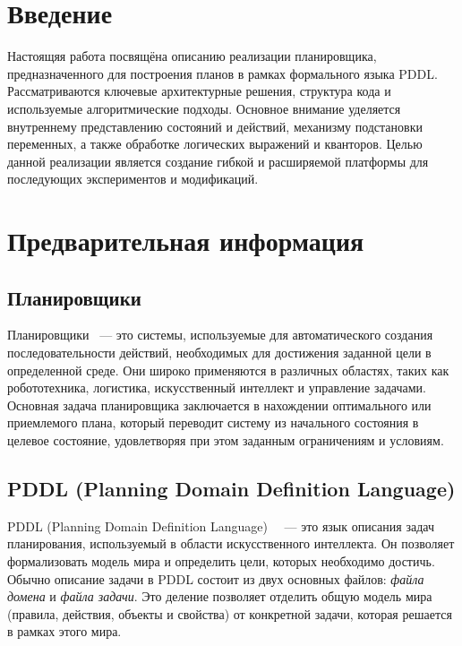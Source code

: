 \documentclass{article}
\begin{document}
\newpage

\tableofcontents

\newpage

\section{Введение}

Настоящяя работа посвящёна описанию реализации планировщика, предназначенного для построения планов в рамках формального языка PDDL. Рассматриваются ключевые архитектурные решения, структура кода и используемые алгоритмические подходы. Основное внимание уделяется внутреннему представлению состояний и действий, механизму подстановки переменных, а также обработке логических выражений и кванторов. Целью данной реализации является создание гибкой и расширяемой платформы для последующих экспериментов и модификаций.

\section{Предварительная информация}

\subsection{Планировщики}
Планировщики~\cite{ghallab2004automated} --- это системы, используемые для автоматического создания последовательности действий, необходимых для достижения заданной цели в определенной среде. Они широко применяются в различных областях, таких как робототехника, логистика, искусственный интеллект и управление задачами. Основная задача планировщика заключается в нахождении оптимального или приемлемого плана, который переводит систему из начального состояния в целевое состояние, удовлетворяя при этом заданным ограничениям и условиям.

\subsection{PDDL (Planning Domain Definition Language)}

PDDL (Planning Domain Definition Language)~\cite{mcdermott1998pddl}~\cite{gerevini2006pddl3}
--- это язык описания задач планирования, используемый в области искусственного интеллекта.
Он позволяет формализовать модель мира и определить цели, которых необходимо достичь.
Обычно описание задачи в PDDL состоит из двух основных файлов:
\textit{файла домена} и \textit{файла задачи}.
Это деление позволяет отделить общую модель мира (правила, действия, объекты и свойства)
от конкретной задачи, которая решается в рамках этого мира.
\end{document}
